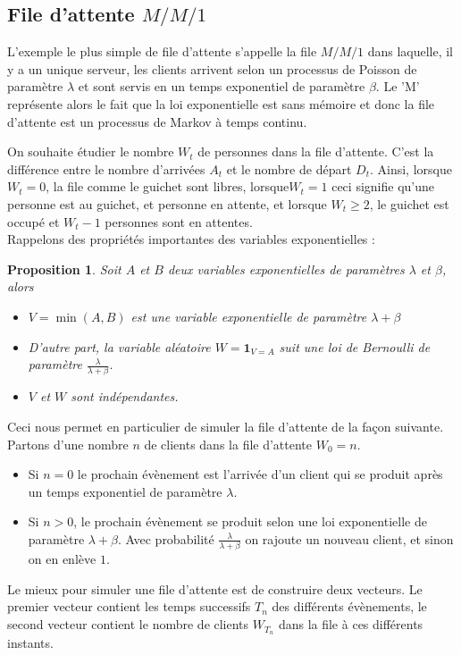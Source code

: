 \documentclass[a4paper,12pt]{book}
\newtheorem{propfr}[thmfr]{Proposition}
\begin{document}
\subsection{File d'attente $M/M/1$  }
L'exemple le plus simple de file d'attente s'appelle la file $M/M/1$ dans laquelle, il y a un unique serveur, les clients arrivent selon un processus de Poisson de paramètre $\lambda$ et sont servis en un temps exponentiel de paramètre $\beta$. Le 'M' représente alors le fait que la loi exponentielle est sans mémoire et donc la file d'attente est un processus de Markov à temps continu.


On souhaite étudier le nombre $W_t$ de personnes dans la file d'attente. C'est la différence entre le nombre d'arrivées $A_t$ et le nombre de départ $D_t$. Ainsi, lorsque $W_t=0$, la file comme le guichet sont libres, lorsque$W_t=1$ ceci signifie qu'une personne est au guichet, et personne en attente, et lorsque $W_t\ge2$, le guichet est occupé et $W_t-1$ personnes sont en attentes.\\


Rappelons des propriétés importantes des variables exponentielles :
\begin{propfr}
Soit $A$ et $B$ deux variables exponentielles de paramètres $\lambda$ et $\beta$, alors
\begin{itemize}
\item $V=\min(A,B)$ est une variable exponentielle de paramètre $\lambda+\beta$
\item D'autre part, la variable aléatoire $W=\mathbf{1}_{V=A}$ suit une loi de Bernoulli de paramètre $\frac{\lambda}{\lambda+\beta}$.
\item $V$ et $W$ sont indépendantes.
\end{itemize}
\end{propfr}

Ceci nous permet en particulier de simuler la file d'attente de la façon suivante. Partons d'une nombre $n$ de clients dans la file d'attente
$W_0=n$.
\begin{itemize}
\item Si $n=0$ le prochain évènement est l'arrivée d'un client qui se produit après un temps exponentiel de paramètre $\lambda$.
\item Si $n>0$, le prochain évènement se produit selon une loi exponentielle de paramètre $\lambda+\beta$. Avec probabilité $\frac{\lambda}{\lambda+\beta}$ on rajoute un nouveau client, et sinon on en enlève $1$.
\end{itemize}
Le mieux pour simuler une file d'attente est de construire deux vecteurs. Le premier vecteur contient les temps successifs $T_n$ des différents évènements, le second vecteur contient le nombre de clients $W_{T_n}$ dans la file à ces différents instants.
\end{document}
